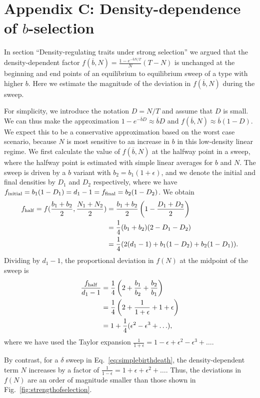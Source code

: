 \documentclass[12pt]{article}
\begin{document}
\section*{Appendix C: Density-dependence of $b$-selection}

In section ``Density-regulating traits under strong selection'' we argued that the density-dependent factor $f(\overline{b},N)=\frac{1-e^{-\overline{b}N/T}}{N}(T-N)$ is unchanged at the beginning and end points of an equilibrium to equilibrium sweep of a type with higher $b$. Here we estimate the magnitude of the deviation in $f(\overline{b},N)$ during the sweep. 

For simplicity, we introduce the notation $D=N/T$ and assume that $D$ is small. We can thus make the approximation $1-e^{-\overline{b}D}\approx \overline{b}D$ and $f(\overline{b},N)\approx \overline{b}(1-D)$. We expect this to be a conservative approximation based on the worst case scenario, because $N$ is most sensitive to an increase in $b$ in this low-density linear regime. We first calculate the value of $f(\overline{b},N)$ at the halfway point in a sweep, where the halfway point is estimated with simple linear averages for $b$ and $N$. The sweep is driven by a $b$ variant with $b_2=b_1(1+\epsilon)$, and we denote the initial and final densities by $D_1$ and $D_2$ respectively, where we have $f_{\rm initial}=b_1(1-D_1)=d_1-1=f_{\rm final}=b_2(1-D_2)$. We obtain
\begin{align}
f_{\rm{half}}=f(\frac{b_1+b_2}{2},\frac{N_1+N_2}{2})&=\frac{b_1+b_2}{2}\left(1-\frac{D_1+D_2}{2}\right) \nonumber \\
&=\frac{1}{4} (b_1+b_2)(2-D_1-D_2) \nonumber \\
&=\frac{1}{4} (2(d_1-1)+b_1(1-D_2)+b_2(1-D_1)).
\end{align}
Dividing by $d_1-1$, the proportional deviation in $f(N)$ at the midpoint of the sweep is
\begin{align}
\frac{f_{\rm{half}}}{d_1-1}&=\frac{1}{4}\left(2+\frac{b_1}{b_2}+\frac{b_2}{b_1}\right)\nonumber \\
&=\frac{1}{4}\left(2+\frac{1}{1+\epsilon}+1+\epsilon\right)\nonumber \\
&=1+\frac{1}{4}(\epsilon^2-\epsilon^3+\ldots),
\end{align}
where we have used the Taylor expansion $\frac{1}{1+\epsilon}=1-\epsilon+\epsilon^2-\epsilon^3+\ldots$. 

By contrast, for a $\delta$ sweep in Eq.~\eqref{eq:simplebirthdeath}, the density-dependent term $N$ increases by a factor of $\frac{1}{1-\epsilon}=1+\epsilon+\epsilon^2+\ldots$. Thus,  the deviations in $f(N)$ are an order of magnitude smaller than those shown in Fig.~\eqref{fig:strengthofselection}.
\end{document}
